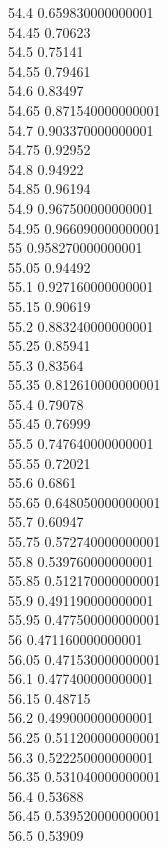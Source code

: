 {54.4	0.659830000000001\\
54.45	0.70623\\
54.5	0.75141\\
54.55	0.79461\\
54.6	0.83497\\
54.65	0.871540000000001\\
54.7	0.903370000000001\\
54.75	0.92952\\
54.8	0.94922\\
54.85	0.96194\\
54.9	0.967500000000001\\
54.95	0.966090000000001\\
55	0.958270000000001\\
55.05	0.94492\\
55.1	0.927160000000001\\
55.15	0.90619\\
55.2	0.883240000000001\\
55.25	0.85941\\
55.3	0.83564\\
55.35	0.812610000000001\\
55.4	0.79078\\
55.45	0.76999\\
55.5	0.747640000000001\\
55.55	0.72021\\
55.6	0.6861\\
55.65	0.648050000000001\\
55.7	0.60947\\
55.75	0.572740000000001\\
55.8	0.539760000000001\\
55.85	0.512170000000001\\
55.9	0.491190000000001\\
55.95	0.477500000000001\\
56	0.471160000000001\\
56.05	0.471530000000001\\
56.1	0.477400000000001\\
56.15	0.48715\\
56.2	0.499000000000001\\
56.25	0.511200000000001\\
56.3	0.522250000000001\\
56.35	0.531040000000001\\
56.4	0.53688\\
56.45	0.539520000000001\\
56.5	0.53909\\
}
